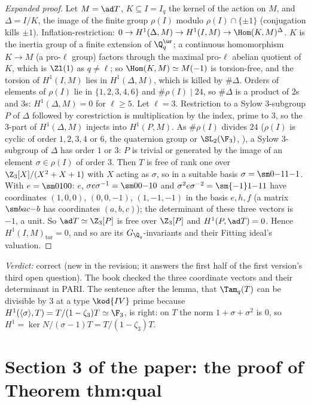 \begin{sloppypar}
\begin{proof}[Expanded proof]
Let $M=\ad T$, $K\subseteq I=I_q$ the kernel of the action on $M$, and $\Delta=I/K$, the image of the finite group $\rho(I)$ modulo $\rho(I)\cap\{\pm1\}$ (conjugation kills $\pm1$).
Inflation-restriction: $0\to H^1(\Delta,M)\to H^1(I,M)\to\Hom(K,M)^\Delta$. $K$ is the inertia group of a finite extension of $\Q_q^{\ur}$; a continuous homomorphism $K\to M$ (a pro-$\ell$
group) factors through the maximal pro-$\ell$ abelian quotient of $K$, which is $\Zl(1)$ as $q\ne\ell$; so $\Hom(K,M)\simeq M(-1)$ is torsion-free, and the torsion of $H^1(I,M)$ lies in
$H^1(\Delta,M)$, which is killed by $\#\Delta$. Orders of elements of $\rho(I)$ lie in $\{1,2,3,4,6\}$ and $\#\rho(I)\mid24$, so $\#\Delta$ is a product of $2$s and $3$s: $H^1(\Delta,M)=0$ for
$\ell\ge5$. Let $\ell=3$. Restriction to a Sylow $3$-subgroup $P$ of $\Delta$ followed by corestriction is multiplication by the index, prime to $3$, so the $3$-part of
$H^1(\Delta,M)$ injects into $H^1(P,M)$. As $\#\rho(I)$ divides $24$ ($\rho(I)$ is cyclic of order $1,2,3,4$ or $6$, the quaternion group or $\SL_2(\F_3)$, ), a Sylow $3$-subgroup of $\Delta$ has
order $1$ or $3$: $P$ is trivial or generated by the image of an element $\sigma\in\rho(I)$ of order $3$. Then $T$ is free of rank one over $\Z_3[X]/(X^2+X+1)$
with $X$ acting as $\sigma$, so in a suitable basis $\sigma=\sm0{-1}1{-1}$. With $e=\sm0100$: $e$, $\sigma e\sigma^{-1}=\sm0{0}{-1}0$ and $\sigma^2e\sigma^{-2}=\sm{-1}1{-1}1$ have coordinates $(1,0,0)$,
$(0,0,-1)$, $(1,-1,-1)$ in the basis $e,h,f$ (a matrix $\sm b a c{-b}$ has coordinates $(a,b,c)$); the determinant of these three vectors is $-1$, a unit. So $\ad T\simeq\Z_3[P]$ is free over
$\Z_3[P]$ and $H^1(P,\ad T)=0$. Hence $H^1(I,M)_{\mathrm{tor}}=0$, and so are its $G_{\Q_q}$-invariants and their Fitting ideal's valuation.
\end{proof}

\noindent\emph{Verdict:} correct (new in the revision; it answers the first half of the first version's third open question). The book checked the three
coordinate vectors and their determinant in PARI. The sentence after the lemma, that $\Tam_q(T)$ can be divisible by $3$ at a type $\kod{IV}$ prime because
$H^1(\langle\sigma\rangle,T)=T/(1-\zeta_3)T\simeq\F_3$, is right: on $T$ the norm $1+\sigma+\sigma^2$ is $0$, so $H^1=\ker N/(\sigma-1)T=T/(1-\zeta_3)T$.

\section[Paper 3: Theorem thm:qual]{Section 3 of the paper: the proof of Theorem thm:qual}\label{sec:paper:qual}


\end{sloppypar}
